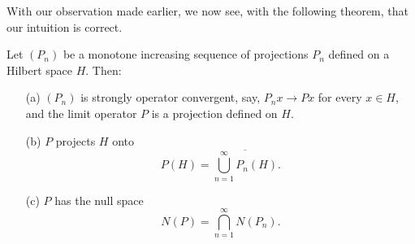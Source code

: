 
With our observation made earlier, we now see, with the following theorem, that our intuition is correct.

\begin{theorem}
    Let \( ({P}_{n}) \) be a monotone increasing sequence of projections \( {P}_{n} \) defined on a Hilbert space \( H  \). Then:
    \begin{enumerate}
        \item[(a)] \( ({P}_{n}) \) is strongly operator convergent, say, \( {P}_{n}x \to Px   \) for every \( x \in H  \), and the limit operator \( P  \) is a projection defined on \( H  \).
        \item[(b)] \( P \) projects \(H  \) onto 
            \[  P(H) = \overline{\bigcup_{ n=1  }^{ \infty  }  {P}_{n}(H) }. \]
        \item[(c)] \( P  \) has the null space 
            \[  N(P) = \bigcap_{ n=1  }^{ \infty  }  N({P}_{n}). \]
    \end{enumerate}
\end{theorem}


